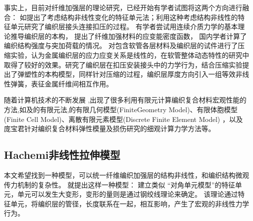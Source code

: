  
  
事实上，目前对纤维加强层的理论研究，已经开始有学者试图将这两个方向进行融合：
如\citeauthor{Reese2003}\cite{Reese2003}提出了考虑结构非线性变化的特征单元法；\citeauthor{Rattensperger2003}\cite{Rattensperger2003}利用这种考虑结构非线性的特征单元研究了编织层接头连接扣压的过程。
有学者尝试用连续介质力学的基本理论推导编织层的本构，\citeauthor{Horgan2005}\cite{Horgan2005} 提出了纤维加强材料的应变能密度函数，
国内学者计算了编织结构强度与突加荷载的情况\cite{renjiusheng2009}。
\citeauthor{Wijaya2012}\cite{Wijaya2012}对包含软管各层材料及编织层的试件进行了压缩实验，认为金属编织层的应力应变关系是线性的，在软管整体动态特性的研究中取得了较好的效果。\citeauthor{Cho2005}\cite{Cho2005}研究了编织层在扣压安装接头中的力学行为，结合压缩实验提出了弹塑性的本构模型，\citeauthor{Rattensperger2003}\cite{Rattensperger2003}同样针对压缩的过程，编织层厚度方向引入一组等效非线性弹簧，表征金属纤维间相互作用。
\cite{peirce19375,menges1976spannungs,kato1999formulation,schock1989some,hino1994evaluation}

随着计算机技术的不断发展 ,出现了很多利用有限元计算编织复合材料宏观性能的方法,如\citeauthor{walrath1983losipescu}\cite{walrath1983losipescu}及\citeauthor{hexiaodong1992}\cite{hexiaodong1992}的有限元法,\citeauthor{whyte1986structure}的有限几何模型(FiniteGeometry Model)\cite{whyte1986structure}、有限体胞模型(Finite Cell Model)\cite{chen1999mechanical}、离散有限元素模型(Discrete Finite Element Model) \cite{whitcomb1991}，以及庞宝君\cite{pangbaojun2001}针对编织复合材料弹性模量及损伤研究的细观计算力学方法等。


\subsection{Hachemi非线性拉伸模型}

本文希望找到一种模型，可以统一纤维编织加强层的结构非线性，和编织结构微观传力机制的复杂性。
\citeauthor{Hachemi2011}\cite{Hachemi2011}就提出这样一种模型：
建立类似
 \citeauthor{ma_elastic_1986} “对角单元模型”\cite{ma_elastic_1986}的特征单元，单元可以发生大变形，变形的量则是通过钢绞线理论来确定。
 该理论通过特征单元，将编织层的管径，长度联系在一起，相互影响，产生了宏观的非线性力学行为。

